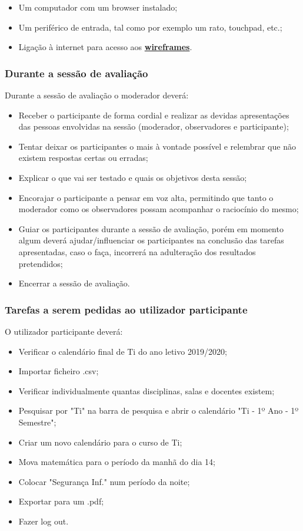 \documentclass[11pt, twoside]{report}
\begin{document}
	\begin{itemize}
		\item Um computador com um browser instalado;
		\item Um periférico de entrada, tal como por exemplo um rato, touchpad, etc.;
		\item Ligação à internet para acesso aos \href{https://www.figma.com/file/nhb5nnIrt3fdDoQhYpsN80/Calendario?node-id=9\%3A154}{\textbf{wireframes}}.
	\end{itemize}

\subsubsection*{Durante a sessão de avaliação}	
Durante a sessão de avaliação o moderador deverá:

	\begin{itemize}
		\item Receber o participante de forma cordial e realizar as devidas apresentações das pessoas envolvidas na sessão (moderador, observadores e participante);
		\item Tentar deixar os participantes o mais à vontade possível e relembrar que não existem respostas certas ou erradas;
		\item Explicar o que vai ser testado e quais os objetivos desta sessão;
		\item Encorajar o participante a pensar em voz alta, permitindo que tanto o moderador como os observadores possam acompanhar o raciocínio do mesmo;
		\item Guiar os participantes durante a sessão de avaliação, porém em momento algum deverá ajudar/influenciar os participantes na conclusão das tarefas apresentadas, caso o faça, incorrerá na adulteração dos resultados pretendidos;
		\item Encerrar a sessão de avaliação.
	\end{itemize}
	
	\subsubsection*{Tarefas a serem pedidas ao utilizador participante}	
	O utilizador participante deverá:
	
		\begin{itemize}
			\item Verificar o calendário final de Ti do ano letivo 2019/2020;
			\item Importar ficheiro .csv;
			\item Verificar individualmente quantas disciplinas, salas e docentes existem;
			\item Pesquisar por "Ti" na barra de pesquisa e abrir o calendário "Ti - 1º Ano - 1º Semestre";
			\item Criar um novo calendário para o curso de Ti;
			\item Mova matemática para o período da manhã do dia 14;
			\item Colocar "Segurança Inf." num período da noite;
			\item Exportar para um .pdf;
			\item Fazer log out.
		\end{itemize}
	
\end{document}
